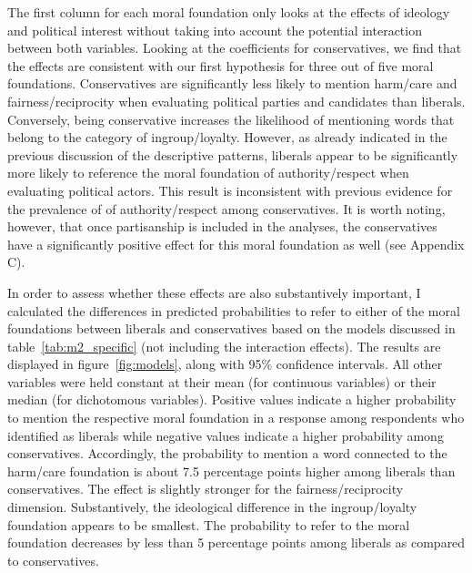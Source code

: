 \documentclass[12pt]{paper}
\begin{document}
The first column for each moral foundation only looks at the effects of ideology and political interest without taking into account the potential interaction between both variables. Looking at the coefficients for conservatives, we find that the effects are consistent with our first hypothesis for three out of five moral foundations. Conservatives are significantly less likely to mention harm/care and fairness/reciprocity when evaluating political parties and candidates than liberals. Conversely, being conservative increases the likelihood of mentioning words that belong to the category of ingroup/loyalty. However, as already indicated in the previous discussion of the descriptive patterns, liberals appear to be significantly more likely to reference the moral foundation of authority/respect when evaluating political actors. This result is inconsistent with previous evidence for the prevalence of of authority/respect among conservatives. It is worth noting, however, that once partisanship is included in the analyses, the conservatives have a significantly positive effect for this moral foundation as well (see Appendix C).

In order to assess whether these effects are also substantively important, I calculated the differences in predicted probabilities to refer to either of the moral foundations between liberals and conservatives based on the models discussed in table~\ref{tab:m2_specific} (not including the interaction effects). The results are displayed in figure~\ref{fig:models}, along with 95\% confidence intervals. All other variables were held constant at their mean (for continuous variables) or their median (for dichotomous variables). Positive values indicate a higher probability to mention the respective moral foundation in a response among respondents who identified as liberals while negative values indicate a higher probability among conservatives. Accordingly, the probability to mention a word connected to the harm/care foundation is about 7.5 percentage points higher among liberals than conservatives. The effect is slightly stronger for the fairness/reciprocity dimension. Substantively, the ideological difference in the ingroup/loyalty foundation appears to be smallest. The probability to refer to the moral foundation decreases by less than 5 percentage points among liberals as compared to conservatives.
\end{document}
